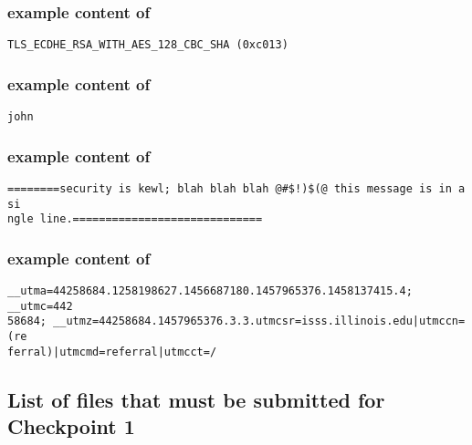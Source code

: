 \hypertarget{servercsformat}{}
\subsubsection*{example content of \texttt{\hyperlink{cp1servercs}{\fileservercs}}}
\begin{mdframed}
\begin{Verbatim}
TLS_ECDHE_RSA_WITH_AES_128_CBC_SHA (0xc013)
\end{Verbatim}
\end{mdframed}

\hypertarget{nameformat}{}
\subsubsection*{example content of \texttt{\hyperlink{cp1name}{\filename}}}
\begin{mdframed}
\begin{Verbatim}
john
\end{Verbatim}
\end{mdframed}

\hypertarget{msgformat}{}
\subsubsection*{example content of \texttt{\hyperlink{cp1msg}{\filemsg}}}
\begin{mdframed}
\begin{Verbatim}
========security is kewl; blah blah blah @#$!)$(@ this message is in a si
ngle line.=============================
\end{Verbatim}
\end{mdframed}

\hypertarget{cookieformat}{}
\subsubsection*{example content of \texttt{\hyperlink{cp1cookie}{\filecookie}}}
\begin{mdframed}
\begin{Verbatim}
__utma=44258684.1258198627.1456687180.1457965376.1458137415.4; __utmc=442
58684; __utmz=44258684.1457965376.3.3.utmcsr=isss.illinois.edu|utmccn=(re
ferral)|utmcmd=referral|utmcct=/
\end{Verbatim}
\end{mdframed}

\pagebreak

\subsection*{List of files that must be submitted for Checkpoint 1}


